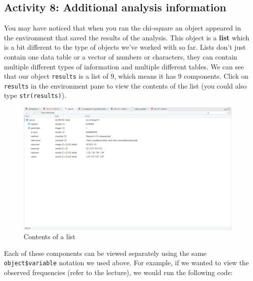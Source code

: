 \documentclass[]{book}
\newenvironment{Shaded}{\begin{snugshade}}{\end{snugshade}}
\newcommand{\NormalTok}[1]{#1}
\newcommand{\OperatorTok}[1]{\textcolor[rgb]{0.81,0.36,0.00}{\textbf{#1}}}
\begin{document}
\hypertarget{activity-8-additional-analysis-information}{%
\subsection{Activity 8: Additional analysis information}\label{activity-8-additional-analysis-information}}

You may have noticed that when you ran the chi-square an object appeared in the environment that saved the results of the analysis. This object is a \textbf{list} which is a bit different to the type of objects we've worked with so far. Lists don't just contain one data table or a vector of numbers or characters, they can contain multiple different types of information and multiple different tables. We can see that our object \texttt{results} is a list of 9, which means it has 9 components. Click on \texttt{results} in the environment pane to view the contents of the list (you could also type \texttt{str(results)}).

\begin{figure}

{\centering \includegraphics[width=1\linewidth]{images/lists} 

}

\caption{Contents of a list}\label{fig:img-lists}
\end{figure}

Each of these components can be viewed separately using the same \texttt{object\$variable} notation we used above. For example, if we wanted to view the observed frequencies (refer to the lecture), we would run the following code:

\begin{Shaded}
\end{Shaded}
\end{document}
